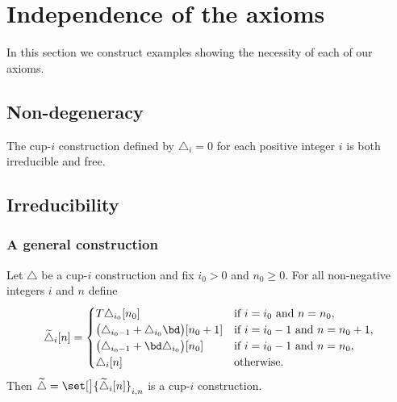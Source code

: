 \section{Independence of the axioms}

In this section we construct examples showing the necessity of each of our axioms.

\subsection{Non-degeneracy}

The cup-$i$ construction defined by $\triangle_i = 0$ for each positive integer $i$ is both irreducible and free.

\subsection{Irreducibility}

\subsubsection{A general construction}

\begin{lemma}
	Let $\triangle$ be a cup-$i$ construction and fix $i_0 > 0$ and $n_0 \geq 0$.
	For all non-negative integers $i$ and $n$ define
	\[
	\widetilde\triangle_i[n] =
	\begin{cases}
		T\triangle_{i_0}[n_0] & \text{if }i=i_0 \text{ and } n=n_0, \\
		\big(\triangle_{i_0-1} + \triangle_{i_0}\bd\big)[n_0+1] & \text{if }i=i_0-1 \text{ and } n=n_0+1, \\
		\big(\triangle_{i_0-1} + \bd\triangle_{i_0}\big)[n_0] & \text{if }i=i_0-1 \text{ and } n=n_0, \\
		\triangle_{i}[n] & \text{otherwise}.
	\end{cases}
	\]
	Then $\widetilde\triangle = \set[\big]{\widetilde\triangle_i[n]}_{i,n}$ is a cup-$i$ construction.
\end{lemma}

